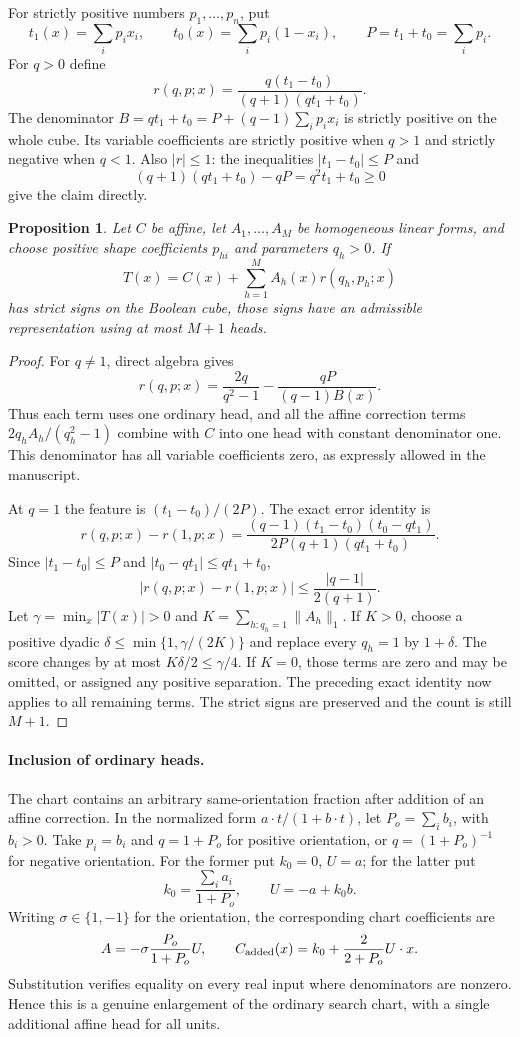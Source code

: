\documentclass[11pt]{article}
\newtheorem{proposition}{Proposition}
\begin{document}
For strictly positive numbers $p_1,\ldots,p_n$, put
\[
 t_1(x)=\sum_i p_ix_i,\qquad
 t_0(x)=\sum_i p_i(1-x_i),\qquad P=t_1+t_0=\sum_i p_i.
\]
For $q>0$ define
\[
 r(q,p;x)=\frac{q(t_1-t_0)}{(q+1)(qt_1+t_0)}.
\]
The denominator $B=qt_1+t_0=P+(q-1)\sum_i p_ix_i$ is
strictly positive on the whole cube. Its variable coefficients are
strictly positive when $q>1$ and strictly negative when $q<1$.
Also $|r|\le1$: the inequalities $|t_1-t_0|\le P$ and
\[
 (q+1)(qt_1+t_0)-qP=q^2t_1+t_0\ge0
\]
give the claim directly.

\begin{proposition}
Let $C$ be affine, let $A_1,\ldots,A_M$ be homogeneous linear
forms, and choose positive shape coefficients $p_{hi}$ and parameters
$q_h>0$. If
\[
 T(x)=C(x)+\sum_{h=1}^M A_h(x)r(q_h,p_h;x)
\]
has strict signs on the Boolean cube, those signs have an admissible
representation using at most $M+1$ heads.
\end{proposition}
\begin{proof}
For $q\ne1$, direct algebra gives
\[
 r(q,p;x)=\frac{2q}{q^2-1}
          -\frac{qP}{(q-1)B(x)}.
\]
Thus each term uses one ordinary head, and all the affine correction
terms $2q_hA_h/(q_h^2-1)$ combine with $C$ into one head with
constant denominator one. This denominator has all variable
coefficients zero, as expressly allowed in the manuscript.

At $q=1$ the feature is $(t_1-t_0)/(2P)$. The exact error identity is
\[
 r(q,p;x)-r(1,p;x)=
 \frac{(q-1)(t_1-t_0)(t_0-qt_1)}
 {2P(q+1)(qt_1+t_0)}.
\]
Since $|t_1-t_0|\le P$ and $|t_0-qt_1|\le qt_1+t_0$,
\[
 |r(q,p;x)-r(1,p;x)|\le\frac{|q-1|}{2(q+1)}.
\]
Let $\gamma=\min_x|T(x)|>0$ and
$K=\sum_{h:q_h=1}\|A_h\|_1$. If $K>0$, choose a positive
dyadic $\delta\le\min\{1,\gamma/(2K)\}$ and replace every
$q_h=1$ by $1+\delta$. The score changes by at most
$K\delta/2\le\gamma/4$. If $K=0$, those terms are zero and
may be omitted, or assigned any positive separation. The preceding
exact identity now applies to all remaining terms. The strict signs
are preserved and the count is still $M+1$.
\end{proof}

\paragraph{Inclusion of ordinary heads.}
The chart contains an arbitrary same-orientation fraction after
addition of an affine correction. In the normalized form
$a\cdot t/(1+b\cdot t)$, let $P_o=\sum_i b_i$, with $b_i>0$.
Take $p_i=b_i$ and $q=1+P_o$ for positive orientation, or
$q=(1+P_o)^{-1}$ for negative orientation. For the former put
$k_0=0$, $U=a$; for the latter put
\[
 k_0=\frac{\sum_i a_i}{1+P_o},\qquad U=-a+k_0b.
\]
Writing $\sigma\in\{1,-1\}$ for the orientation, the corresponding
chart coefficients are
\[
 A=-\sigma\frac{P_o}{1+P_o}U,\qquad
 C_{\rm added}(x)=k_0+\frac{2}{2+P_o}U\cdot x.
\]
Substitution verifies equality on every real input where denominators
are nonzero. Hence this is a genuine enlargement of the ordinary
search chart, with a single additional affine head for all units.
\end{document}
